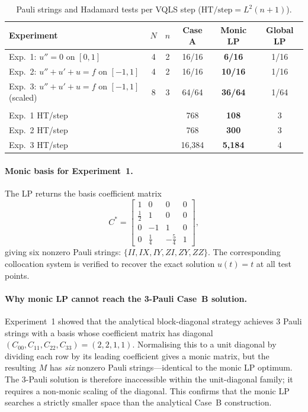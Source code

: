 \documentclass{article}
\begin{document}
\begin{table}[h]
\centering
\caption{Pauli strings and Hadamard tests per VQLS step ($\mathrm{HT/step} = L^2(n+1)$).}
\label{tab:monic}
\begin{tabular}{lccccc}
\toprule
Experiment & $N$ & $n$ & Case A & Monic LP & Global LP \\
\midrule
Exp.~1: $u''=0$ on $[0,1]$                  & 4 & 2 & 16/16 & \textbf{6/16} & 1/16 \\
Exp.~2: $u''+u'+u=f$ on $[-1,1]$            & 4 & 2 & 16/16 & \textbf{10/16} & 1/16 \\
Exp.~3: $u''+u'+u=f$ on $[-1,1]$ (scaled)  & 8 & 3 & 64/64 & \textbf{36/64} & 1/64 \\
\midrule
 & & & & & \\[-8pt]
Exp.~1 HT/step & & & 768 & \textbf{108} & 3 \\
Exp.~2 HT/step & & & 768 & \textbf{300} & 3 \\
Exp.~3 HT/step & & & 16{,}384 & \textbf{5{,}184} & 4 \\
\bottomrule
\end{tabular}
\end{table}

\paragraph{Monic basis for Experiment~1.}
The LP returns the basis coefficient matrix
\begin{equation}
C^* =
\begin{bmatrix}
1 & 0 & 0 & 0 \\
\tfrac{1}{2} & 1 & 0 & 0 \\
0 & -1 & 1 & 0 \\
0 & \tfrac{1}{4} & -\tfrac{5}{4} & 1
\end{bmatrix},
\end{equation}
giving six nonzero Pauli strings: $\{II, IX, IY, ZI, ZY, ZZ\}$.  The corresponding
collocation system is verified to recover the exact solution $u(t) = t$ at all test
points.

\paragraph{Why monic LP cannot reach the 3-Pauli Case~B solution.}
Experiment~1 showed that the analytical block-diagonal strategy achieves 3 Pauli
strings with a basis whose coefficient matrix has diagonal $(C_{00}, C_{11}, C_{22},
C_{33}) = (2, 2, 1, 1)$.  Normalising this to a unit diagonal by dividing each row
by its leading coefficient gives a monic matrix, but the resulting $M$ has
\emph{six} nonzero Pauli strings---identical to the monic LP optimum.  The 3-Pauli
solution is therefore inaccessible within the unit-diagonal family; it requires a
non-monic scaling of the diagonal.  This confirms that the monic LP searches a
strictly smaller space than the analytical Case~B construction.
\end{document}
